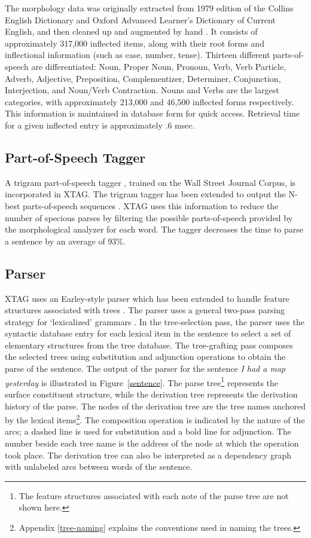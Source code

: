 The morphology data was originally extracted from 1979 edition of the Collins
English Dictionary and Oxford Advanced Learner's Dictionary of Current English,
and then cleaned up and augmented by hand \cite{karp92}.  It consists of
approximately 317,000 inflected items, along with their root forms and
inflectional information (such as case, number, tense).  Thirteen different
parts-of-speech are differentiated: Noun, Proper Noun, Pronoun, Verb, Verb
Particle, Adverb, Adjective, Preposition, Complementizer, Determiner,
Conjunction, Interjection, and Noun/Verb Contraction.  Nouns and Verbs are the
largest categories, with approximately 213,000 and 46,500 inflected forms
respectively.  This information is maintained in database form for quick
access.  Retrieval time for a given inflected entry is approximately .6 msec.

\subsection{Part-of-Speech Tagger}

A trigram part-of-speech tagger \cite{kwc88}, trained on the Wall Street
Journal Corpus, is incorporated in XTAG. The trigram tagger has been extended to
output the N-best parts-of-speech sequences \cite{soong90}.  XTAG uses this
information to reduce the number of specious parses by filtering the possible
parts-of-speech provided by the morphological analyzer for each word.  The
tagger decreases the time to parse a sentence by an average of 93\%.

\subsection{Parser}

XTAG uses an Earley-style parser which has been extended to handle
feature structures associated with trees \cite{schabes90}. The parser uses a
general two-pass parsing strategy for `lexicalized' grammars \cite{schabes88}.
In the tree-selection pass, the parser uses the syntactic database entry for
each lexical item in the sentence to select a set of elementary structures from
the tree database.  The tree-grafting pass composes the selected trees using
substitution and adjunction operations to obtain the parse of the sentence.
The output of the parser for the sentence {\it I had a map yesterday} is
illustrated in Figure~\ref{sentence}. The parse tree\footnote{The feature
structures associated with each note of the parse tree are not shown here.}
represents the surface constituent structure, while the derivation tree
represents the derivation history of the parse. The nodes of the derivation
tree are the tree names anchored by the lexical items\footnote{Appendix
\ref{tree-naming} explains the conventions used in naming the trees.}.  The
composition operation is indicated by the nature of the arcs; a dashed line is
used for substitution and a bold line for adjunction.  The number beside each
tree name is the address of the node at which the operation took place.  The
derivation tree can also be interpreted as a dependency graph with unlabeled
arcs between words of the sentence.

